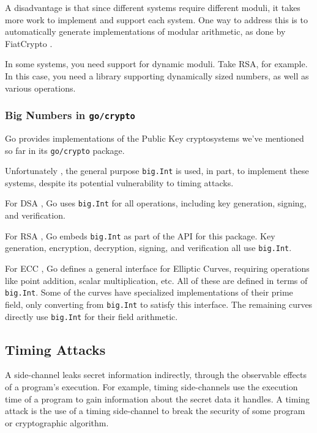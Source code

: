 \documentclass[11pt, a4paper]{article} %
\begin{document}
{A disadvantage is that since different systems require different moduli,
it takes more work to implement and support each system.
One way to address this is to automatically generate implementations
of modular arithmetic, as done by FiatCrypto
\cite{hvass_high-assurance_nodate}.

In some systems, you need support for dynamic moduli.
Take RSA, for example.
In this case, you need a library supporting dynamically
sized numbers, as well as various operations.

\subsubsection{Big Numbers in \texttt{go/crypto}}

Go provides implementations of the Public Key cryptosystems
we've mentioned so far in its \texttt{go/crypto} package.

Unfortunately \cite{ford_proposal_2017}, the general purpose
\texttt{big.Int} is used, in part, to implement these systems,
despite its potential vulnerability to timing attacks.

For DSA \cite{technology_digital_1994}, Go uses \texttt{big.Int}
for all operations, including key generation, signing, and verification.

For RSA \cite{rivest_method_1978}, Go embeds \texttt{big.Int}
as part of the API for
this package. Key generation, encryption, decryption, signing,
and verification all use \texttt{big.Int}.

For ECC \cite{miller_use_1986}, Go defines a general interface
for Elliptic Curves, requiring operations like point addition,
scalar multiplication, etc. All of these are defined in terms
of \texttt{big.Int}. Some of the curves have specialized
implementations of their prime field, only converting from
\texttt{big.Int} to satisfy this interface. The remaining curves
directly use \texttt{big.Int} for their field arithmetic.

\subsection{Timing Attacks}

A side-channel
\cite{kelsey_side_1998}
leaks secret information indirectly,
through the observable effects of a program's execution.
For example, timing side-channels use the execution time of a program
to gain information about the secret data it handles. 
A timing attack is the use of a timing side-channel to break the security
of some program or cryptographic algorithm.

}
\end{document}
